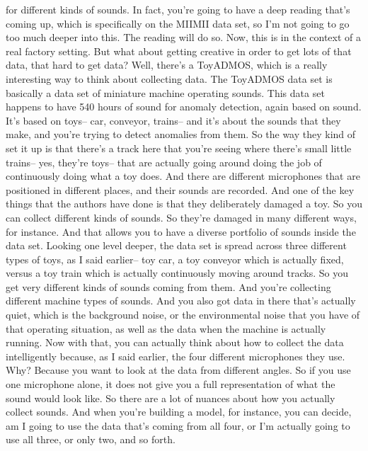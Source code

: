   for different kinds of sounds.
  In fact, you're going to have a deep reading that's coming up,
  which is specifically on the MIIMII data set,
  so I'm not going to go too much deeper into this.
  The reading will do so.
  Now, this is in the context of a real factory setting.
  But what about getting creative in order to get lots of that data, that hard
  to get data?
  Well, there's a ToyADMOS, which is a really interesting way
  to think about collecting data.
  The ToyADMOS data set is basically a data set of miniature machine operating
  sounds.
  This data set happens to have 540 hours of sound for anomaly detection,
  again based on sound.
  It's based on toys--
  car, conveyor, trains-- and it's about the sounds that they make,
  and you're trying to detect anomalies from them.
  So the way they kind of set it up is that there's a track here
  that you're seeing where there's small little trains--
  yes, they're toys-- that are actually going
  around doing the job of continuously doing what a toy does.
  And there are different microphones that are positioned in different places,
  and their sounds are recorded.
  And one of the key things that the authors have done
  is that they deliberately damaged a toy.
  So you can collect different kinds of sounds.
  So they're damaged in many different ways, for instance.
  And that allows you to have a diverse portfolio
  of sounds inside the data set.
  Looking one level deeper, the data set is
  spread across three different types of toys, as I said earlier--
  toy car, a toy conveyor which is actually fixed,
  versus a toy train which is actually continuously moving around tracks.
  So you get very different kinds of sounds coming from them.
  And you're collecting different machine types of sounds.
  And you also got data in there that's actually quiet,
  which is the background noise, or the environmental noise
  that you have of that operating situation,
  as well as the data when the machine is actually running.
  Now with that, you can actually think about how
  to collect the data intelligently because, as I said earlier, the four
  different microphones they use.
  Why?
  Because you want to look at the data from different angles.
  So if you use one microphone alone, it does not
  give you a full representation of what the sound would look like.
  So there are a lot of nuances about how you actually collect sounds.
  And when you're building a model, for instance, you can decide,
  am I going to use the data that's coming from all four,
  or I'm actually going to use all three, or only two, and so forth.
